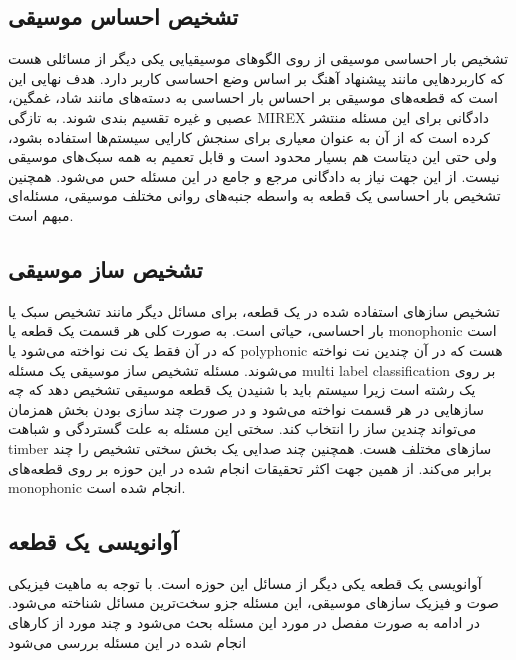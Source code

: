 \subsection{تشخیص احساس موسیقی}
تشخیص بار احساسی موسیقی از روی الگوهای موسیقیایی یکی دیگر از مسائلی هست که
کاربردهایی مانند پیشنهاد آهنگ بر اساس وضع احساسی کاربر دارد. هدف نهایی این است
که قطعه‌های موسیقی بر احساس بار احساسی به دسته‌های مانند شاد، غمگین، عصبی و غیره
تقسیم بندی شوند. به تازگی MIREX دادگانی برای این مسئله منتشر کرده است که از آن
به عنوان معیاری برای سنجش کارایی سیستم‌ها استفاده بشود، ولی حتی این دیتاست هم
بسیار محدود است و قابل تعمیم به همه سبک‌های موسیقی نیست. از این جهت نیاز به
دادگانی مرجع و جامع در این مسئله حس می‌شود. همچنین تشخیص بار احساسی یک قطعه به
واسطه جنبه‌های روانی مختلف موسیقی، مسئله‌ای مبهم است.

\subsection{تشخیص ساز موسیقی}
تشخیص سازهای استفاده شده در یک قطعه، برای مسائل دیگر مانند تشخیص سبک یا بار
احساسی، حیاتی است. به صورت کلی هر قسمت یک قطعه یا \gls{monophonic} است که در آن
فقط یک نت نواخته می‌شود یا \gls{polyphonic} هست که در آن چندین نت نواخته
می‌شوند. مسئله تشخیص ساز موسیقی یک مسئله \gls{multi label classification} بر روی
یک رشته است زیرا سیستم باید با شنیدن یک قطعه موسیقی تشخیص دهد که چه سازهایی در
هر قسمت نواخته می‌شود و در صورت چند سازی بودن بخش همزمان می‌تواند چندین ساز را
انتخاب کند. سختی این مسئله به علت گستردگی و شباهت \gls{timber} سازهای مختلف هست.
همچنین چند صدایی یک بخش سختی تشخیص را چند برابر می‌کند. از همین جهت اکثر تحقیقات
انجام شده در این حوزه بر روی قطعه‌های \gls{monophonic} انجام شده است.

\subsection{آوانویسی یک قطعه}
آوانویسی یک قطعه یکی دیگر از مسائل این حوزه است. با توجه به ماهیت فیزیکی صوت و
فیزیک سازهای موسیقی، این مسئله جزو سخت‌ترین مسائل شناخته می‌شود. در ادامه به
صورت مفصل در مورد این مسئله بحث می‌شود و چند مورد از کارهای انجام شده در این
مسئله بررسی می‌شود

